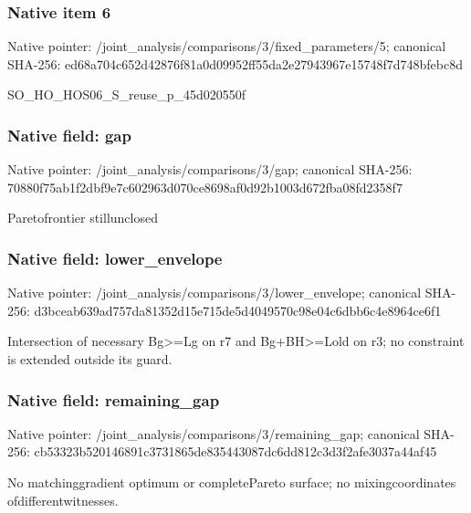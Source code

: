 \documentclass[10pt,a4paper]{article}
\begin{document}
\subsubsection{Native item 6}
Native pointer: /joint\_\allowbreak{}analysis/comparisons/3/fixed\_\allowbreak{}parameters/5; canonical SHA-256: ed68a704c652d42876f81a0d09952ff55da2e27943967e15748f7d748bfebc8d

\begingroup\raggedright\sloppy SO\_\allowbreak{}HO\_\allowbreak{}HOS06\_\allowbreak{}S\_\allowbreak{}reuse\_\allowbreak{}p\_\allowbreak{}45d020550f\par\endgroup

\subsubsection{Native field: gap}
Native pointer: /joint\_\allowbreak{}analysis/comparisons/3/gap; canonical SHA-256: 70880f75ab1f2dbf9e7c602963d070ce8698af0d92b1003d672fba08fd2358f7

\begingroup\raggedright\sloppy Paretofrontier stillunclosed\par\endgroup

\subsubsection{Native field: lower\_\allowbreak{}envelope}
Native pointer: /joint\_\allowbreak{}analysis/comparisons/3/lower\_\allowbreak{}envelope; canonical SHA-256: d3bceab639ad757da81352d15e715de5d4049570c98e04c6dbb6c4e8964ce6f1

\begingroup\raggedright\sloppy Intersection of necessary Bg>=\allowbreak{}Lg on r7 and Bg+BH>=\allowbreak{}Lold on r3;\allowbreak{} no constraint is extended outside its guard.\par\endgroup

\subsubsection{Native field: remaining\_\allowbreak{}gap}
Native pointer: /joint\_\allowbreak{}analysis/comparisons/3/remaining\_\allowbreak{}gap; canonical SHA-256: cb53323b520146891c3731865de835443087dc6dd812c3d3f2afe3037a44af45

\begingroup\raggedright\sloppy No matchinggradient optimum or completePareto surface;\allowbreak{} no mixingcoordinates ofdifferentwitnesses.\par\endgroup
\end{document}
